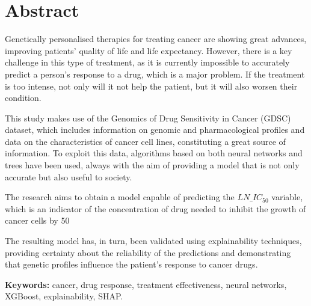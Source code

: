 \chapter*{Abstract}
Genetically personalised therapies for treating cancer are showing great advances, improving patients' quality of life and life expectancy. However, there is a key challenge in this type of treatment, as it is currently impossible to accurately predict a person's response to a drug, which is a major problem. If the treatment is too intense, not only will it not help the patient, but it will also worsen their condition.

This study makes use of the Genomics of Drug Sensitivity in Cancer (GDSC) dataset, which includes information on genomic and pharmacological profiles and data on the characteristics of cancer cell lines, constituting a great source of information. To exploit this data, algorithms based on both neural networks and trees have been used, always with the aim of providing a model that is not only accurate but also useful to society.

The research aims to obtain a model capable of predicting the  \(LN\_IC_{50}\) variable, which is an indicator of the concentration of drug needed to inhibit the growth of cancer cells by 50%

The resulting model has, in turn, been validated using explainability techniques, providing certainty about the reliability of the predictions and demonstrating that genetic profiles influence the patient's response to cancer drugs.

\vspace{.5cm}

\textbf{Keywords:} cancer, drug response, treatment effectiveness, neural networks, XGBoost, explainability, SHAP.